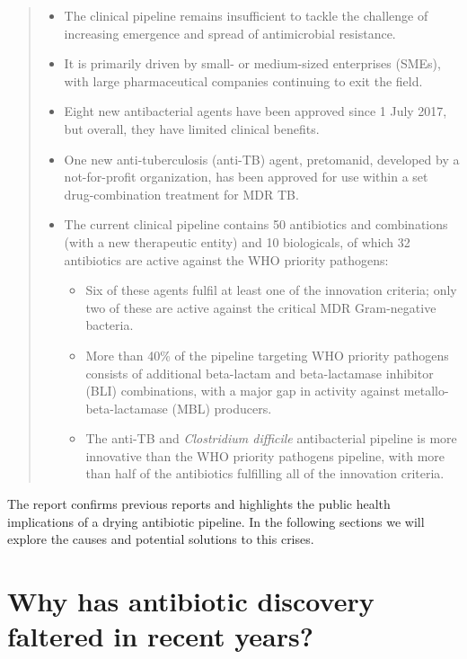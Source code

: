 \documentclass[
]{book}
\begin{document}
\begin{quote}
\begin{itemize}
\item
  The clinical pipeline remains insufficient to tackle the challenge of increasing emergence and spread of antimicrobial resistance.
\item
  It is primarily driven by small- or medium-sized enterprises (SMEs), with large pharmaceutical companies continuing to exit the field.
\item
  Eight new antibacterial agents have been approved since 1 July 2017, but overall, they have limited clinical benefits.
\item
  One new anti-tuberculosis (anti-TB) agent, pretomanid, developed by a not-for-profit organization, has been approved for use within a set drug-combination treatment for MDR TB.
\item
  The current clinical pipeline contains 50 antibiotics and combinations (with a new therapeutic entity) and 10 biologicals, of which 32 antibiotics are active against the WHO priority pathogens:

  \begin{itemize}
  \item
    Six of these agents fulfil at least one of the innovation criteria; only two of these are active against the critical MDR Gram-negative bacteria.
  \item
    More than 40\% of the pipeline targeting WHO priority pathogens consists of additional beta-lactam and beta-lactamase inhibitor (BLI) combinations, with a major gap in activity against metallo-beta-lactamase (MBL) producers.
  \item
    The anti-TB and \emph{Clostridium difficile} antibacterial pipeline is more innovative than the WHO priority pathogens pipeline, with more than half of the antibiotics fulfilling all of the innovation criteria.
  \end{itemize}
\end{itemize}
\end{quote}

The report confirms previous reports and highlights the public health implications of a drying antibiotic pipeline. In the following sections we will explore the causes and potential solutions to this crises.

\hypertarget{why-has-antibiotic-discovery-faltered-in-recent-years}{%
\section*{Why has antibiotic discovery faltered in recent years?}\label{why-has-antibiotic-discovery-faltered-in-recent-years}}
\end{document}
